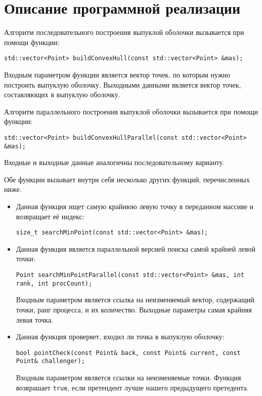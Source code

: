 \documentclass{report}
\begin{document}
\section*{Описание программной реализации}
Алгоритм последовательного построения выпуклой оболочки вызывается при помощи функции:
\begin{lstlisting}
std::vector<Point> buildConvexHull(const std::vector<Point> &mas);
\end{lstlisting}
\par Входным параметром функции является вектор точек, по которым нужно построить выпуклую оболочку. Выходными данными является вектор точек, составляющих в выпуклую оболочку.
\par Алгоритм параллельного построения выпуклой оболочки вызывается при помощи функции:
\begin{lstlisting}
std::vector<Point> buildConvexHullParallel(const std::vector<Point> &mas);
\end{lstlisting}
\par Входные и выходные данные аналогичны последовательному варианту.
\par Обе функции вызывает внутри себя несколько других функций, перечисленных ниже.
\begin{itemize}
\par \item Данная функция ищет самую крайнюю левую точку в переданном массиве и возвращает её индекс:
\begin{lstlisting}
size_t searchMinPoint(const std::vector<Point> &mas);
\end{lstlisting}
\par \item Данная функция является параллельной версией поиска самой крайней левой точки:
\begin{lstlisting}
Point searchMinPointParallel(const std::vector<Point> &mas, int rank, int procCount);
\end{lstlisting}
\par Входным параметром является ссылка на неизменяемый вектор, содержащий точки, ранг процесса, и их количество. Выходные параметры самая крайняя левая точка.
\par \item Данная функция проверяет, входил ли точка в выпуклую оболочку:
\begin{lstlisting}
bool pointCheck(const Point& back, const Point& current, const Point& challenger);
\end{lstlisting}
\par Входным параметром является ссылки на неизменяемые точки. Функция возврашает \verb|true|, если претендент лучше нашего предыдущего претедента.
\end{itemize}
\end{document}
